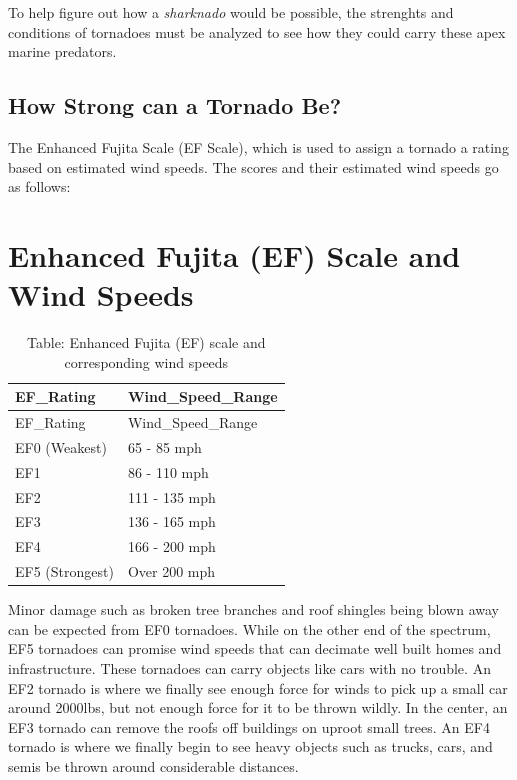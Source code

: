 \documentclass[
  letterpaper,
  DIV=11,
  numbers=noendperiod]{scrreprt}
\begin{document}
To help figure out how a \emph{sharknado} would be possible, the
strenghts and conditions of tornadoes must be analyzed to see how they
could carry these apex marine predators.

\subsection{How Strong can a Tornado
Be?}\label{how-strong-can-a-tornado-be}

The Enhanced Fujita Scale (EF Scale), which is used to assign a tornado
a rating based on estimated wind speeds. The scores and their estimated
wind speeds go as follows:

\section{Enhanced Fujita (EF) Scale and Wind
Speeds}\label{enhanced-fujita-ef-scale-and-wind-speeds}

\begin{longtable}[]{@{}ll@{}}
\caption{Table: Enhanced Fujita (EF) scale and corresponding wind
speeds}\tabularnewline
\toprule\noalign{}
EF\_Rating & Wind\_Speed\_Range \\
\midrule\noalign{}
\endfirsthead
\toprule\noalign{}
EF\_Rating & Wind\_Speed\_Range \\
\midrule\noalign{}
\endhead
\bottomrule\noalign{}
\endlastfoot
EF0 (Weakest) & 65 - 85 mph \\
EF1 & 86 - 110 mph \\
EF2 & 111 - 135 mph \\
EF3 & 136 - 165 mph \\
EF4 & 166 - 200 mph \\
EF5 (Strongest) & Over 200 mph \\
\end{longtable}

Minor damage such as broken tree branches and roof shingles being blown
away can be expected from EF0 tornadoes. While on the other end of the
spectrum, EF5 tornadoes can promise wind speeds that can decimate well
built homes and infrastructure. These tornadoes can carry objects like
cars with no trouble. An EF2 tornado is where we finally see enough
force for winds to pick up a small car around 2000lbs, but not enough
force for it to be thrown wildly. In the center, an EF3 tornado can
remove the roofs off buildings on uproot small trees. An EF4 tornado is
where we finally begin to see heavy objects such as trucks, cars, and
semis be thrown around considerable distances.
\end{document}
